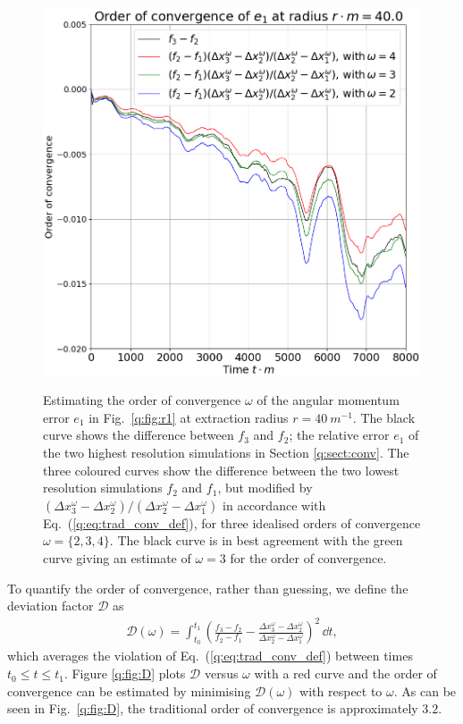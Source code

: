 \begin{figure}[h]
{\includegraphics[width=0.65\columnwidth]{png/paper_conv123.png}}
\caption{Estimating the order of convergence $\omega$ of the angular momentum error $e_1$ in Fig.~\ref{q:fig:r1} at extraction radius $r=40 ~m^{-1}$. The black curve shows the difference between $f_3$ and $f_2$; the relative error $e_1$ of the two highest resolution simulations in Section \ref{q:sect:conv}. The three coloured curves show the difference between the two lowest resolution simulations $f_2$ and $f_1$, but modified by $(\Delta x_3^\omega - \Delta x_2^\omega)/(\Delta x_2^\omega - \Delta x_1^\omega)$ in accordance with Eq.~(\ref{q:eq:trad_conv_def}), for three idealised orders of convergence $\omega=\{2,3,4\}$. The black curve is in best agreement with the green curve giving an estimate of $\omega=3$ for the order of convergence. }
\label{q:fig:234}
\end{figure}



To quantify the order of convergence, rather than guessing, we define the deviation factor $\mathcal{D}$ as
\begin{align}\label{q:eq:tradconv}
\mathcal{D}(\omega) = \int_{t_0}^{t_1}\left(\frac{f_3-f_2}{f_2-f_1} - \frac{ \Delta x_3^\omega-\Delta x_2^\omega }{ \Delta x_2^\omega-\Delta x_1^\omega }\right)^2\,\dd t,
\end{align}
which averages the violation of Eq.~(\ref{q:eq:trad_conv_def}) between times $t_0\leq t\leq t_1$. Figure \ref{q:fig:D} plots $\mathcal{D}$ versus $\omega$ with a red curve and the order of convergence can be estimated by minimising $\mathcal{D}(\omega)$ with respect to $\omega$. As can be seen in Fig.~\ref{q:fig:D}, the traditional order of convergence is approximately $3.2$.

